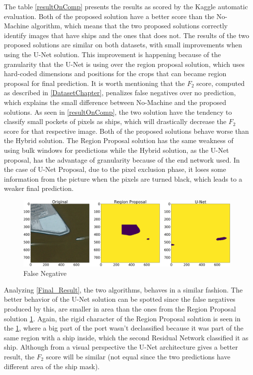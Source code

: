 The table \ref{resultOnComp} presents the results as scored by the Kaggle automatic evaluation. Both of the proposed solution have a better score than the No-Machine algorithm, which means that the two proposed solutions correctly identify images that have ships and the ones that does not. The results of the two proposed solutions are similar on both datasets, with small improvements when using the U-Net solution. This improvement is happening because of the granularity that the U-Net is using over the region proposal solution, which uses hard-coded dimensions and positions for the crops that can became region proposal for final prediction. It is worth mentioning that the $F_2$ score, computed as described in \ref{DatasetChapter}, penalizes false negatives over no prediction, which explains the small difference between No-Machine and the proposed solutions. As seen in \ref{resultOnComp}, the two solution have the tendency to classify small pockets of pixels as ships, which will drastically decrease the $F_2$ score for that respective image. Both of the proposed solutions behave worse than the Hybrid solution. The Region Proposal solution has the same weakness of using bulk windows for predictions while the Hybrid solution, as the U-Net proposal, has the advantage of granularity because of the end network used. In the case of U-Net Proposal, due to the pixel exclusion phase, it loses some information from the picture when the pixels are turned black, which leads to a weaker final prediction.

\begin{figure}
	\includegraphics[width=\textwidth]{Pictures/016Comparison4.png}
	\caption{False Negative}
	\label{false_neg_size}
\end{figure}

Analyzing \ref{Final_Result}, the two algorithms, behaves in a similar fashion. The better behavior of the U-Net solution can be spotted since the false negatives produced by this, are smaller in area than the ones from the Region Proposal solution \ref{false_neg_size}. Again, the rigid character of the Region Proposal solution is seen in the \ref{false_neg_size}, where a big part of the port wasn't declassified because it was part of the same region with a ship inside, which the second Residual Network classified it as ship. Although from a visual perspective the U-Net architecture gives a better result, the $F_2$ score will be similar (not equal since the two predictions have different area of the ship mask).

